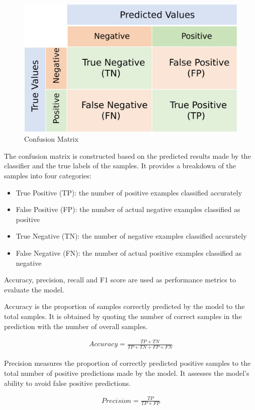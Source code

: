 \documentclass[ %
                    author={Louis Wang},
                supervisor={Dr. Qiang Liu},
                    degree={MSc},
                     title={Identification of Suicide Ideation in Texts},
                      type={},
                      year={2024}]{dissertation}
\begin{document}
\begin{figure}[h]
      \centering
      \includegraphics[width=0.5\linewidth]{../img/confusion matrix.eps}
      \caption{Confusion Matrix}
      \label{fig:confusion matrix}
\end{figure}

The confusion matrix is constructed based on the predicted results made by the classifier and the true labels of the samples. It provides a breakdown of the samples into four categories:

\begin{itemize}
      \item True Positive (TP): the number of positive examples classified accurately
      \item False Positive (FP): the number of actual negative examples classified as positive
      \item True Negative (TN): the number of negative examples classified accurately
      \item False Negative (FN): the number of actual positive examples classified as negative
\end{itemize}

Accuracy, precision, recall and F1 score are used as performance metrics to evaluate the model. 

Accuracy is the proportion of samples correctly predicted by the model to the total samples. It is obtained by quoting the number of correct samples in the prediction with the number of overall samples.

\begin{eqnarray}
      Accuracy = \frac{TP + TN}{TP + TN + FP + FN}
      \label{acc}
\end{eqnarray}

Precision measures the proportion of correctly predicted positive samples to the total number of positive predictions made by the model. It assesses the model's ability to avoid false positive predictions.

\begin{eqnarray}
      Precision = \frac{TP}{TP + FP}
      \label{pre}
\end{eqnarray}
\end{document}
